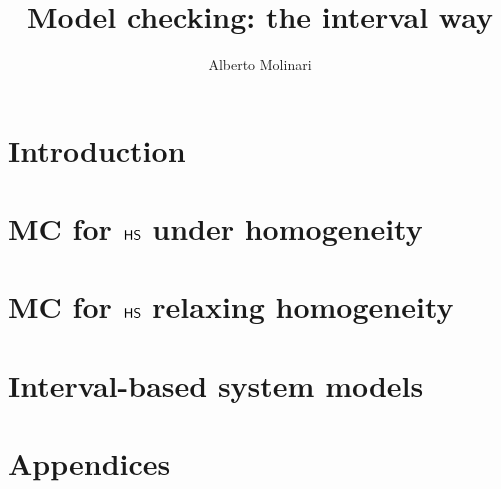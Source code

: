 \documentclass[10pt,italian,english,a5paper,twoside,openright]{book}
\title{Model checking: the interval way}
\author{Alberto Molinari}
\date{}
\begin{document}
\frontmatter



%

\cleardoublepage


\cleardoublepage


\cleardoublepage


\cleardoublepage

 
\cleardoublepage
\dominitoc %
\tableofcontents


\mainmatter

\part{Introduction}\label{part:intro}
%


\part{MC for $\text{\sffamily HS}$ under homogeneity}\label{part:HShomo}





\part{MC for $\text{\sffamily HS}$ relaxing homogeneity}\label{part:HSrelaxhomo}


\part{Interval-based system models}\label{part:timelines}



\appendix
\part{Appendices}







\backmatter
\cleardoublepage

 

\end{document}
